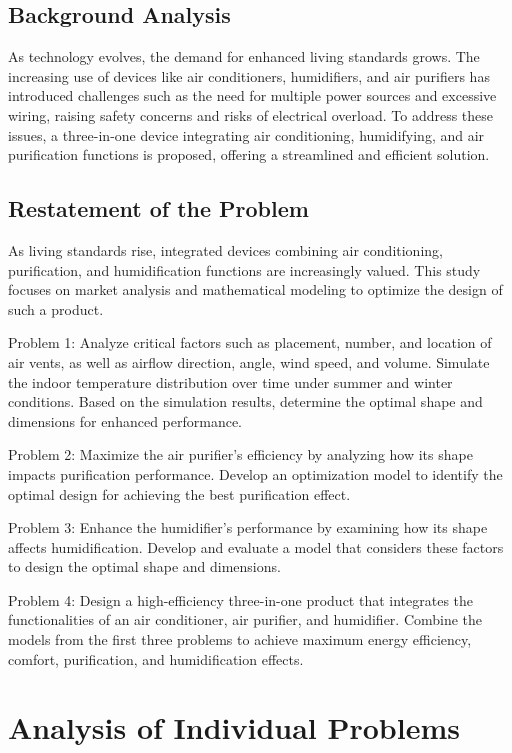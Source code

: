 \documentclass{apmcmthesis}
\begin{document}
\subsection{ Background Analysis}
As technology evolves, the demand for enhanced living standards grows. The increasing use of devices like air conditioners, humidifiers, and air purifiers has introduced challenges such as the need for multiple power sources and excessive wiring, raising safety concerns and risks of electrical overload. To address these issues, a three-in-one device integrating air conditioning, humidifying, and air purification functions is proposed, offering a streamlined and efficient solution.

\subsection{Restatement of the Problem}
As living standards rise, integrated devices combining air conditioning, purification, and humidification functions are increasingly valued. This study focuses on market analysis and mathematical modeling to optimize the design of such a product.

Problem 1: Analyze critical factors such as placement, number, and location of air vents, as well as airflow direction, angle, wind speed, and volume. Simulate the indoor temperature distribution over time under summer and winter conditions. Based on the simulation results, determine the optimal shape and dimensions for enhanced performance.

Problem 2: Maximize the air purifier's efficiency by analyzing how its shape impacts purification performance. Develop an optimization model to identify the optimal design for achieving the best purification effect.

Problem 3: Enhance the humidifier’s performance by examining how its shape affects humidification. Develop and evaluate a model that considers these factors to design the optimal shape and dimensions.

Problem 4: Design a high-efficiency three-in-one product that integrates the functionalities of an air conditioner, air purifier, and humidifier. Combine the models from the first three problems to achieve maximum energy efficiency, comfort, purification, and humidification effects.





\section{Analysis of Individual Problems}
\end{document}
